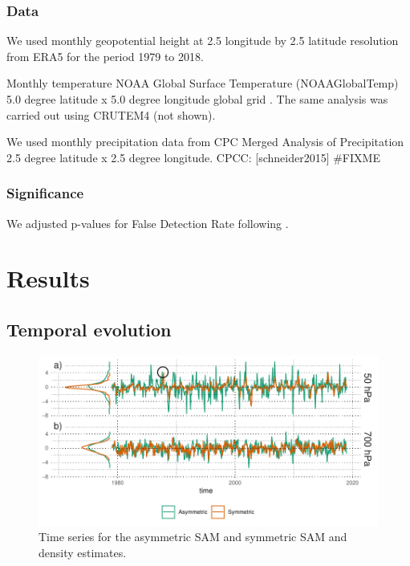 \documentclass[]{ametsocV5}
\begin{document}
\subsubsection{Data}

We used monthly geopotential height at 2.5 longitude by 2.5 latitude
resolution from ERA5 \citep{hersbach2020} for the period 1979 to 2018.

Monthly temperature NOAA Global Surface Temperature (NOAAGlobalTemp) 5.0
degree latitude x 5.0 degree longitude global grid
\citep{vose2012, smith2008}. The same analysis was carried out using
CRUTEM4 \citep{osborn2014} (not shown).

We used monthly precipitation data from CPC Merged Analysis of
Precipitation \citep{xie1997} 2.5 degree latitude x 2.5 degree
longitude. CPCC: {[}schneider2015{]} \#FIXME

\subsubsection{Significance}

We adjusted p-values for False Detection Rate following
\citet{wilks2016}.

\section{Results}

\subsection{Temporal evolution}

\begin{figure}
\includegraphics{asymsam-timeseries-1} \caption[Time series for the asymmetric SAM and symmetric SAM and density estimates]{Time series for the asymmetric SAM and symmetric SAM and density estimates.}\label{fig:asymsam-timeseries}
\end{figure}
\end{document}
